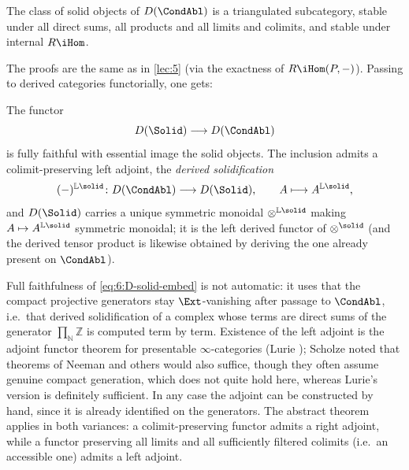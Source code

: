 \begin{corollary}
\label{cor:6:triangulated}
The class of solid objects of $D(\CondAbl)$ is a triangulated subcategory, stable
under all direct sums, all products and all limits and colimits, and stable
under internal $R\iHom$.
\end{corollary}

The proofs are the same as in \cref{lec:5} (via the exactness of
$R\iHom(P,-)$). Passing to derived categories functorially, one gets:

\begin{proposition}
\label{prop:6:derived-solidification}
The functor
\begin{equation}
\label{eq:6:D-solid-embed}
D(\Solid)\longrightarrow D(\CondAbl)
\end{equation}
is fully faithful with essential image the solid objects. The inclusion admits a
colimit-preserving left adjoint, the \emph{derived solidification}
\begin{equation*}
(-)^{\mathbb{L}\solid}\colon D(\CondAbl)\longrightarrow D(\Solid),\qquad
A\longmapsto A^{\mathbb{L}\solid},
\end{equation*}
and $D(\Solid)$ carries a unique symmetric monoidal
$\otimes^{\mathbb{L}\solid}$ making $A\mapsto A^{\mathbb{L}\solid}$ symmetric
monoidal; it is the left derived functor of $\otimes^{\solid}$ (and the derived
tensor product is likewise obtained by deriving the one already present on
$\CondAbl$).
\end{proposition}

\begin{remark}
\label{rmk:6:adjoint-existence}
Full faithfulness of \eqref{eq:6:D-solid-embed} is not automatic: it uses that
the compact projective generators stay $\Ext$-vanishing after passage to
$\CondAbl$, i.e.\ that derived solidification of a complex whose terms are direct
sums of the generator $\prod_{\mathbb{N}}\mathbb{Z}$ is computed term by term.
Existence of the left adjoint is the adjoint functor theorem for presentable
$\infty$-categories (Lurie \cite{lurie2017higher}); Scholze noted that theorems
of Neeman and others would also suffice, though they often assume genuine
compact generation, which does not quite hold here, whereas Lurie's version is
definitely sufficient. In any case the adjoint can be constructed by hand, since
it is already identified on the generators. The abstract theorem applies in both
variances: a colimit-preserving functor admits a right adjoint, while a functor
preserving all limits and all sufficiently filtered colimits (i.e.\ an accessible
one) admits a left adjoint.
\end{remark}


